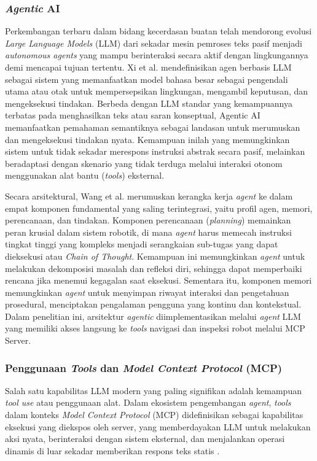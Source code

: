 \subsubsection{\textit{Agentic} AI}
Perkembangan terbaru dalam bidang kecerdasan buatan telah mendorong evolusi \textit{Large Language Models} (LLM) dari sekadar mesin pemroses teks pasif menjadi \textit{autonomous agents} yang mampu berinteraksi secara aktif dengan lingkungannya demi mencapai tujuan tertentu. Xi et al. \cite{xi2025rise} mendefinisikan agen berbasis LLM sebagai sistem yang memanfaatkan model bahasa besar sebagai pengendali utama atau otak untuk mempersepsikan lingkungan, mengambil keputusan, dan mengeksekusi tindakan. Berbeda dengan LLM standar yang kemampuannya terbatas pada menghasilkan teks atau saran konseptual, Agentic AI memanfaatkan pemahaman semantiknya sebagai landasan untuk merumuskan dan mengeksekusi tindakan nyata. Kemampuan inilah yang memungkinkan sistem untuk tidak sekadar merespons instruksi abstrak secara pasif, melainkan beradaptasi dengan skenario yang tidak terduga melalui interaksi otonom menggunakan alat bantu (\textit{tools}) eksternal.

Secara arsitektural, Wang et al. \cite{wang2024survey} merumuskan kerangka kerja \textit{agent} ke dalam empat komponen fundamental yang saling terintegrasi, yaitu profil agen, memori, perencanaan, dan tindakan. Komponen perencanaan (\textit{planning}) memainkan peran krusial dalam sistem robotik, di mana \textit{agent} harus memecah instruksi tingkat tinggi yang kompleks menjadi serangkaian sub-tugas yang dapat dieksekusi atau \textit{Chain of Thought}. Kemampuan ini memungkinkan \textit{agent} untuk melakukan dekomposisi masalah dan refleksi diri, sehingga dapat memperbaiki rencana jika menemui kegagalan saat eksekusi. Sementara itu, komponen memori memungkinkan \textit{agent} untuk menyimpan riwayat interaksi dan pengetahuan prosedural, menciptakan pengalaman pengguna yang kontinu dan kontekstual. Dalam penelitian ini, arsitektur \textit{agentic} diimplementasikan melalui \textit{agent} LLM yang memiliki akses langsung ke \textit{tools} navigasi dan inspeksi robot melalui MCP Server.

\subsubsection{Penggunaan \textit{Tools} dan \textit{Model Context Protocol} (MCP)}
Salah satu kapabilitas LLM modern yang paling signifikan adalah kemampuan \textit{tool use} atau penggunaan alat. Dalam ekosistem pengembangan \textit{agent}, \textit{tools} dalam konteks \textit{Model Context Protocol} (MCP) didefinisikan sebagai kapabilitas eksekusi yang diekspos oleh server, yang memberdayakan LLM untuk melakukan aksi nyata, berinteraksi dengan sistem eksternal, dan menjalankan operasi dinamis di luar sekadar memberikan respons teks statis \cite{singh2025survey}.

